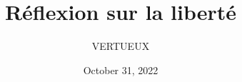 \documentclass[]{cls/tools}
\begin{document}
\title{Réflexion sur la liberté}

\author{VERTUEUX}
\date{October 31, 2022}

\maketitle
\end{document}
